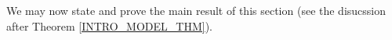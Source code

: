 \documentclass[a4paper,10pt
,draft
]{article}%
\renewcommand{\F}{\mathcal F}
\renewcommand{\1}{\eta}%
\begin{document}


We may now state and prove the main result of this section (see the disucssion after Theorem \ref{INTRO_MODEL_THM}).
\end{document}
